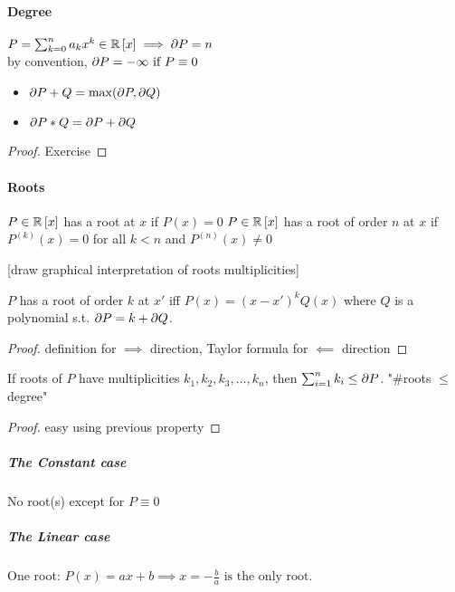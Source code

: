 \paragraph{Degree}
\begin{definition}
	$P = \sum_{k=0}^{n} a_k x^k \in \mathbb{R} \left[ x \right] \implies \partial P = n$\\
	by convention, $\partial P=-\infty \text{ if } P \equiv 0$
\end{definition}
\begin{property}
	\begin{itemize}
		\item $\partial P+Q = \max(\partial P, \partial Q)$
		\item $\partial P*Q = \partial P+\partial Q$
	\end{itemize}
\end{property}
\begin{proof}
	Exercise
\end{proof}

\paragraph{Roots}
\begin{definition}
	$P \in \mathbb{R}\left[ x \right]$ has a root at $x$ if $P(x)=0$
	$P \in \mathbb{R}\left[ x \right]$ has a root of order $n$ at $x$ if $P^{(k)}(x)=0$ for all $k<n$ and $P^{(n)}(x) \neq 0$
\end{definition}
[draw graphical interpretation of roots multiplicities]
\begin{property}
	$P$ has a root of order $k$ at $x'$ iff $P(x) = (x-x')^kQ(x)$ where $Q$ is a polynomial s.t. $\partial P=k+\partial Q$.
\end{property}
\begin{proof}
	definition for $\implies$ direction, Taylor formula for $\impliedby$ direction
\end{proof}
\begin{corollary}
	If roots of $P$ have multiplicities $k_1, k_2, k_3, \dots, k_n$, then $\sum_{i=1}^n k_i \leq \partial P$.
	"\#roots $\leq$ degree"
\end{corollary}
\begin{proof}
	easy using previous property
\end{proof}

\subparagraph{The Constant case}
No root(s) except for $P \equiv 0$

\subparagraph{The Linear case}
One root: $P(x)=ax+b \implies x=-\frac{b}{a} \text{ is the only root}$.

